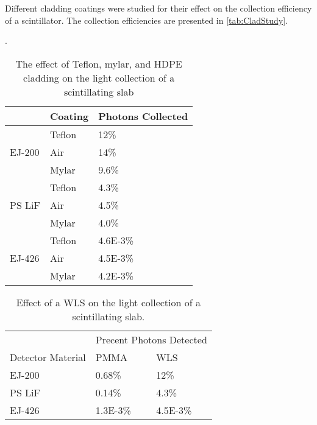 Different cladding coatings were studied for their effect on the collection efficiency of a scintillator.
The collection efficiencies are presented in \autoref{tab:CladStudy}.
\begin{table}
  \caption[Teflon, Mylar, and HDPE Cladding Light Collection Effect]{The effect of Teflon, mylar, and HDPE cladding on the light collection of a scintillating slab}.
  \label{tab:CladStudy}
  \begin{tabular}{p{4cm} m{3cm} m{3cm}}
  \toprule
  & Coating & Photons Collected \\
  \midrule 
  \multirow{3}{*}{EJ-200} & Teflon & 12\% \\
  				      & Air &  14\% \\
				      & Mylar & 9.6\% \\
  \midrule 
  \multirow{3}{*}{PS LiF} & Teflon & 4.3\% \\
  				      & Air & 4.5\% \\
				      & Mylar & 4.0\% \\
  \midrule 
  \multirow{3}{*}{EJ-426} & Teflon & \num{4.6E-3}\% \\
  				      & Air & \num{4.5E-3}\% \\
				      & Mylar & \num{4.2E-3}\% \\
 \bottomrule				 	   				  
  \end{tabular}
\end{table}
  \begin{table}
  \caption[Light Collection Increase with a WLS Bar]{Effect of a WLS on the light collection of a scintillating slab.}
  \label{tab:WLSStudy}
  \begin{tabular}{p{4cm} m{3cm} m{3cm}}
  \toprule
  & \multicolumn{2}{c}{Precent Photons Detected} \\
  Detector Material & PMMA &  WLS \\
  \midrule
 EJ-200 & 0.68\%  & 12\% \\
 PS LiF & 0.14\% & 4.3\% \\
 EJ-426 & \num{1.3E-3}\% & \num{4.5E-3}\% \\
 \bottomrule
  \end{tabular}
\end{table}



